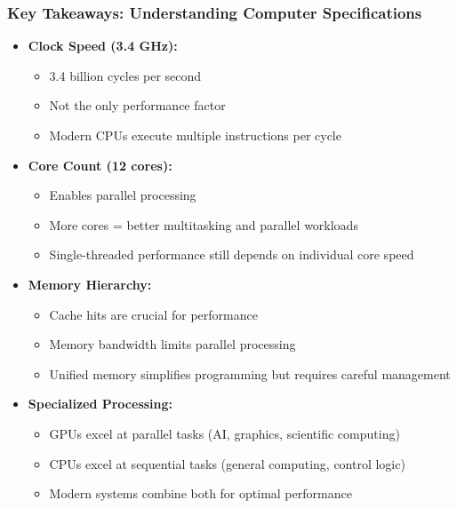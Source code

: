 \begin{frame}
\frametitle{Key Takeaways: Understanding Computer Specifications}
\begin{itemize}
    \item \textbf{Clock Speed (3.4 GHz):}
    \begin{itemize}
        \item 3.4 billion cycles per second
        \item Not the only performance factor
        \item Modern CPUs execute multiple instructions per cycle
    \end{itemize}
    \item \textbf{Core Count (12 cores):}
    \begin{itemize}
        \item Enables parallel processing
        \item More cores = better multitasking and parallel workloads
        \item Single-threaded performance still depends on individual core speed
    \end{itemize}
    \item \textbf{Memory Hierarchy:}
    \begin{itemize}
        \item Cache hits are crucial for performance
        \item Memory bandwidth limits parallel processing
        \item Unified memory simplifies programming but requires careful management
    \end{itemize}
    \item \textbf{Specialized Processing:}
    \begin{itemize}
        \item GPUs excel at parallel tasks (AI, graphics, scientific computing)
        \item CPUs excel at sequential tasks (general computing, control logic)
        \item Modern systems combine both for optimal performance
    \end{itemize}
\end{itemize}
\end{frame}  

